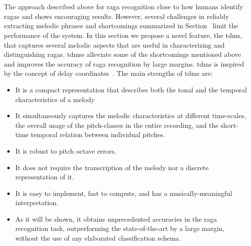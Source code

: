%


\section{}
\label{sec:tdms_raga_recognition}


The approach described above for \gls{raga} recognition close to how humans identify \glspl{raga} and shows encouraging results. However, several challenges in reliably extracting melodic phrases and shortcomings summarized in Section~ limit the performance of the system. In this section we propose a novel feature, the \gls{tdms}, that captures several melodic aspects that are useful in characterizing and distinguishing \glspl{raga}. \Glspl{tdms} alleviate some of the shortcomings mentioned above and improves the accuracy of \gls{raga} recognition by large margins. \Gls{tdms} is inspired by the concept of delay coordinates~. The main strengths of \gls{tdms} are:

\begin{itemize}
	\item It is a compact representation that describes both the tonal and the temporal characteristics of a melody
	\item It simultaneously captures the melodic characteristics at different time-scales, the overall usage of the pitch-classes in the entire recording, and the short-time temporal relation between individual pitches.
	\item It is robust to pitch octave errors.
	\item It does not require the transcription of the melody nor a discrete representation of it.
	\item It is easy to implement, fast to compute, and has a musically-meaningful interpretation.
	\item As it will be shown, it obtains unprecedented accuracies in the raga recognition task, outperforming the state-of-the-art by a large margin, without the use of any elaborated classification schema.
\end{itemize}


\subsection{}
\label{sec:tdms_feature_extraction}

